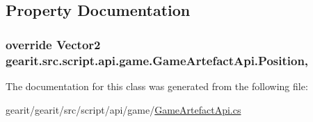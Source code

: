 \subsection{Property Documentation}
\hypertarget{classgearit_1_1src_1_1script_1_1api_1_1game_1_1_game_artefact_api_a78d9df2ac887cbd9cdddee1435348411}{
\subsubsection[{Position}]{\setlength{\rightskip}{0pt plus 5cm}override Vector2 gearit.\+src.\+script.\+api.\+game.\+Game\+Artefact\+Api.\+Position\hspace{0.3cm}{\ttfamily [get]}, {\ttfamily [set]}}}\label{classgearit_1_1src_1_1script_1_1api_1_1game_1_1_game_artefact_api_a78d9df2ac887cbd9cdddee1435348411}


The documentation for this class was generated from the following file\+:\begin{DoxyCompactItemize}
\item 
gearit/gearit/src/script/api/game/\hyperlink{_game_artefact_api_8cs}{Game\+Artefact\+Api.\+cs}\end{DoxyCompactItemize}
